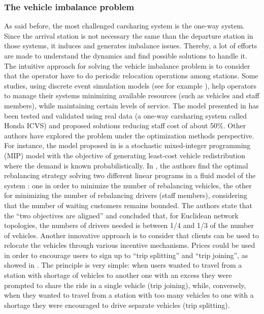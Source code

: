 \begin{bibunit}[ieeetr]
\subsubsection{The vehicle imbalance problem}

As said before, the most challenged carsharing system is the one-way system. Since the arrival station is not necessary the same than the departure station in those systems, it induces and generates imbalance issues.
Thereby, a lot of efforts are made to understand the dynamics and find possible solutions to handle it.
The intuitive approach for solving the vehicle imbalance problem is to consider that the operator have to do periodic relocation operations among stations.
Some studies, using discrete event simulation models (see for example \cite{barth_simulation_1999, kek_relocation_2006, kek_decision_2009}), help operators to manage their systems minimizing available resources (such as vehicles and staff members), while maintaining certain levels of service.
The model presented in \cite{kek_decision_2009} has been tested and validated using real data (a one-way carsharing system called Honda ICVS) and proposed solutions reducing staff cost of about 50\%.
Other authors have explored the problem under the optimization methods perspective.
For instance, the model proposed in \cite{nair_fleet_2011} is a stochastic mixed-integer programming (MIP) model with the objective of generating least-cost vehicle redistribution where the demand is known probabilistically.
In \cite{smith_rebalancing_2013}, the authors find the optimal rebalancing strategy solving two different linear programs in a fluid model of the system : one in order to minimize the number of rebalancing vehicles, the other for minimizing the number of rebalancing drivers (staff members), considering that the number of waiting customers remains bounded.
The authors state that the ``two objectives are aligned'' and concluded that, for Euclidean network topologies, the numbers of drivers needed is between 1/4 and 1/3 of the number of vehicles.
Another innovative approach is to consider that clients can be used to relocate the vehicles through various incentive mechanisms.
Prices could be used in order to encourage users to sign up to ``trip splitting'' and ``trip joining'', as showed in \cite{barth_user_based_2004}.
The principle is very simple: when users wanted to travel from a station with shortage of vehicles to another one with an excess they were prompted to share the ride in a single vehicle (trip joining), while, conversely, when they wanted to travel from a station with too many vehicles to one with a shortage they were encouraged to drive separate vehicles (trip splitting).

\end{bibunit}
